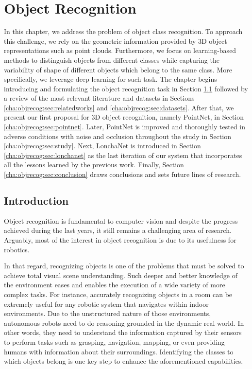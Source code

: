 \chapter{Object Recognition}
\label{cha:objrecog}

\begin{chapterabstract}
In this chapter, we address the problem of object class recognition. To approach this challenge, we rely on the geometric information provided by 3D object representations such as point clouds. Furthermore, we focus on learning-based methods to distinguish objects from different classes while capturing the variability of shape of different objects which belong to the same class. More specifically, we leverage deep learning for such task. The chapter begins introducing and formulating the object recognition task in Section \ref{cha:objrecog:sec:introduction} followed by a review of the most relevant literature and datasets in Sections \ref{cha:objrecog:sec:relatedworks} and \ref{cha:objrecog:sec:datasets}. After that, we present our first proposal for 3D object recognition, namely PointNet, in Section \ref{cha:objrecog:sec:pointnet}. Later, PointNet is improved and thoroughly tested in adverse conditions with noise and occlusion throughout the study in Section \ref{cha:objrecog:sec:study}. Next, LonchaNet is introduced in Section \ref{cha:objrecog:sec:lonchanet} as the last iteration of our system that incorporates all the lessons learned by the previous work. Finally, Section \ref{cha:objrecog:sec:conclusion} draws conclusions and sets future lines of research.
\end{chapterabstract}

\section{Introduction}
\label{cha:objrecog:sec:introduction}

Object recognition is fundamental to computer vision and despite the progress achieved during the last years, it still remains a challenging area of research. Arguably, most of the interest in object recognition is due to its usefulness for robotics.

In that regard, recognizing objects is one of the problems that must be solved to achieve total visual scene understanding. Such deeper and better knowledge of the environment eases and enables the execution of a wide variety of more complex tasks. For instance, accurately recognizing objects in a room can be extremely useful for any robotic system that navigates within indoor environments. Due to the unstructured nature of those environments, autonomous robots need to do reasoning grounded in the dynamic real world. In other words, they need to understand the information captured by their sensors to perform tasks such as grasping, navigation, mapping, or even providing humans with information about their surroundings. Identifying the classes to which objects belong is one key step to enhance the aforementioned capabilities.

